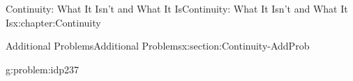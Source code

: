 \begin{chapterptx}{Continuity: What It Isn't and What It Is}{}{Continuity: What It Isn't and What It Is}{}{}{x:chapter:Continuity}
\begin{sectionptx}{Additional Problems}{}{Additional Problems}{}{}{x:section:Continuity-AddProb}
\begin{problem}{}{g:problem:idp237}
		\end{problem}
	\end{sectionptx}
\end{chapterptx}
%
%